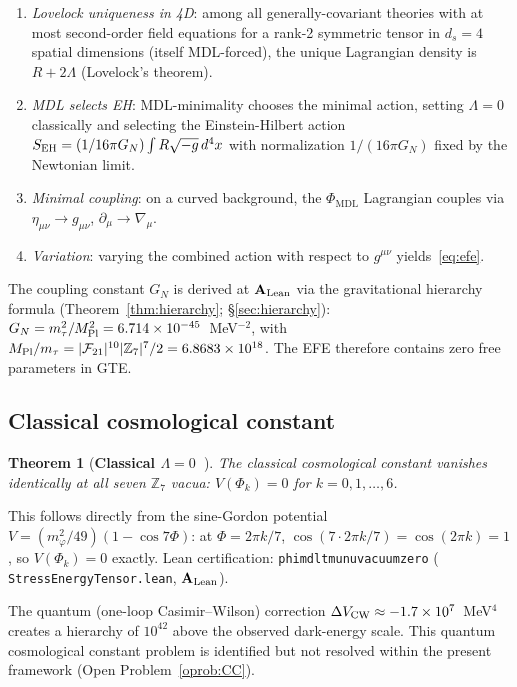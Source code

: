 \documentclass[11pt]{article}
\newtheorem{theorem}{Theorem}[section]
\theoremstyle{remark}
\newcommand{\PHIMDL}{\Phi_{\mathrm{MDL}}}
\newcommand{\ZS}{\mathbb{Z}_7}
\newcommand{\lean}[1]{%
  \penalty-100
  \begingroup\def\_{\textunderscore\allowbreak}\texttt{#1}\endgroup}
\newcommand{\FTT}{\mathcal{F}_{21}}
\newcommand{\CatAL}{\ensuremath{\textbf{A}_{\rm Lean}}}
\begin{document}
\begin{enumerate}[noitemsep]
\item \textit{Lovelock uniqueness in 4D}: among all generally-covariant
  theories with at most second-order field equations for a rank-2 symmetric
  tensor in $d_s=4$ spatial dimensions (itself MDL-forced), the unique
  Lagrangian density is $R + 2\Lambda$ (Lovelock's theorem).
\item \textit{MDL selects EH}: MDL-minimality chooses the minimal action,
  setting $\Lambda=0$ classically and selecting the Einstein-Hilbert action
  $S_{\rm EH} = (1/16\pi G_N)\int R\sqrt{-g}\,d^4x$
  with normalization $1/(16\pi G_N)$ fixed by the Newtonian limit.
\item \textit{Minimal coupling}: on a curved background, the $\PHIMDL$
  Lagrangian couples via $\eta_{\mu\nu}\to g_{\mu\nu}$,
  $\partial_\mu\to\nabla_\mu$.
\item \textit{Variation}: varying the combined action with respect to
  $g^{\mu\nu}$ yields~\eqref{eq:efe}.
\end{enumerate}

The coupling constant $G_N$ is derived at $\CatAL$ via the gravitational
hierarchy formula (Theorem~\ref{thm:hierarchy}; \S\ref{sec:hierarchy}):
$G_N = m_\tau^2/M_{\rm Pl}^2 = 6.714\times10^{-45}$~MeV$^{-2}$,
with $M_{\rm Pl}/m_\tau = |\FTT|^{10}|\ZS|^7/2 = 6.8683\times10^{18}$.
The EFE therefore contains zero free parameters in GTE.

\subsection{Classical cosmological constant}

\begin{theorem}[\textbf{Classical $\Lambda = 0$~\cite{SpivackPhiMDLGravity}}]
\label{thm:lambda}
The classical cosmological constant vanishes identically at all seven $\ZS$
vacua: $V(\Phi_k) = 0$ for $k = 0,1,\ldots,6$.
\end{theorem}

\noindent
This follows directly from the sine-Gordon potential $V = (m_\varphi^2/49)(1-\cos 7\Phi)$:
at $\Phi = 2\pi k/7$, $\cos(7\cdot 2\pi k/7) = \cos(2\pi k) = 1$, so
$V(\Phi_k) = 0$ exactly.  Lean certification:
\lean{phimdl\_tmunu\_vacuum\_zero} (\lean{StressEnergyTensor.lean}, $\CatAL$).

The quantum (one-loop Casimir--Wilson) correction
$\Delta V_{\rm CW} \approx -1.7\times10^{7}$~MeV$^4$ creates a hierarchy of
$10^{42}$ above the observed dark-energy scale.  This quantum cosmological
constant problem is identified but not resolved within the present framework
(Open Problem~\ref{oprob:CC}).
\end{document}
